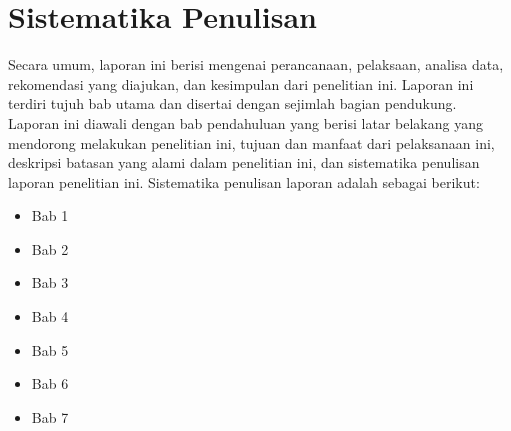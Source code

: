 \section{Sistematika Penulisan}
Secara umum, laporan ini berisi mengenai perancanaan, pelaksaan, analisa data, rekomendasi yang diajukan, dan kesimpulan dari penelitian ini. Laporan ini terdiri tujuh bab utama dan disertai dengan sejimlah bagian pendukung. Laporan ini diawali dengan bab pendahuluan yang berisi latar belakang yang mendorong \saya melakukan penelitian ini, tujuan dan manfaat dari pelaksanaan ini, deskripsi batasan yang \saya alami dalam penelitian ini, dan sistematika penulisan laporan penelitian ini.
Sistematika penulisan laporan adalah sebagai berikut:
\begin{itemize}
	\item Bab 1 \babSatu \\
	\item Bab 2 \babDua \\
	\item Bab 3 \babTiga \\
	\item Bab 4 \babEmpat \\
	\item Bab 5 \babLima \\
	\item Bab 6 \babEnam \\
	\item Bab 7 \babTujuh \\
\end{itemize}